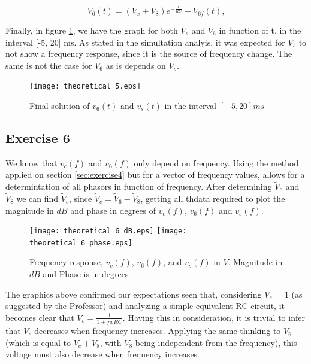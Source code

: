 \begin{equation}
  V_{6}(t) = (V_{x} + V_{8})e^{-\frac{t}{RC}} + V_{6f}(t),
  \label{eq:v6tot}
\end{equation}

Finally, in figure \ref{fig:theoretical_5}, we have the graph for both $V_s$ and $V_6$ in function of t, in the interval [-5, 20] ms. As stated in the simultation analyis, it was expected for $V_s$ to not show a frequency response, since it is the source of frequency change. The same is not the case for $V_6$ as is depends on $V_s$.

\begin{figure}[!ht] \centering
\caption{Final solution of $v_6(t)$ and $v_s(t)$ in the interval $[-5,20]ms$}
\texttt{[image: theoretical\_5.eps]}
\label{fig:theoretical_5}
\end{figure}
\newpage 
\subsection{Exercise 6}
\label{sec:exercise6}
We know that $v_c(f)$ and $v_6(f)$ only depend on frequency. Using the method applied on section \ref{sec:exercise4} but for a vector of frequency values, allows for a determintation of all phasors in function of frequency. After determining  $\tilde{V}_6$ and  $\tilde{V}_8$ we can find  $\tilde{V}_c$, since  $\tilde{V}_c =  \tilde{V}_6 - \tilde{V}_8$, getting all thdata required to plot the magnitude in $dB$ and phase in degrees of $v_c(f)$, $v_6(f)$ and $v_s(f)$. 

\begin{figure}[!ht] 
\caption{Frequency response, $v_{c}(f)$, $v_6(f)$, and $v_s(f)$ in $V$. Magnitude in $dB$ and Phase is in degrees}
\texttt{[image: theoretical\_6\_dB.eps]}
\hfill\texttt{[image: theoretical\_6\_phase.eps]}
\label{fig:theoretical_6}
\end{figure}

The graphics above confirmed our expectations seen that, considering $V_s$ = 1 (as suggested by the Professor) and analyzing a simple equivalent RC circuit, it becomes clear that $V_c = \frac{1}{1 + jwRC}$. Having this in consideration, it is trivial to infer that $V_c$ decreases when frequency increases. Applying the same thinking to $V_6$ (which is equal to $V_c + V_8$, with $V_8$ being independent from the frequency), this voltage must also decrease when frequency increases.
\newpage 

\newpage 





